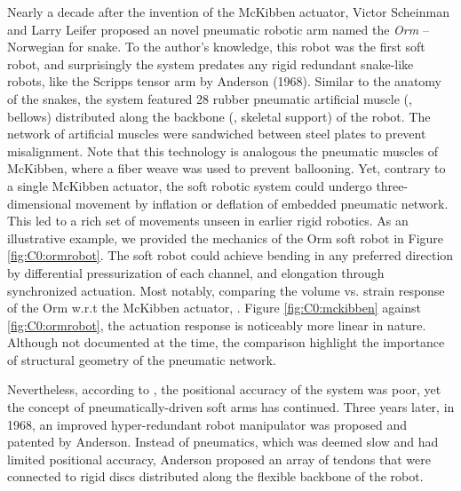 Nearly a decade after the invention of the McKibben actuator, Victor Scheinman and Larry Leifer proposed an {novel} pneumatic robotic arm named the \emph{Orm} -- Norwegian for snake. To the author's knowledge, this robot was the first soft robot, and surprisingly the system predates any rigid redundant snake-like robots, like the Scripps tensor arm by Anderson (1968). Similar to the anatomy of the snakes, the system featured 28 rubber pneumatic artificial muscle (\ie, bellows) distributed along the backbone (\ie, skeletal support) of the robot. The network of artificial muscles were sandwiched between steel plates to prevent misalignment. Note that this technology is analogous the pneumatic muscles of McKibben, where a fiber weave was used to prevent ballooning. Yet, contrary to a single McKibben actuator, the soft robotic system could undergo three-dimensional movement by inflation or deflation of embedded pneumatic network. This led to a rich set of movements unseen in earlier rigid robotics. As an illustrative example, we provided the mechanics of the Orm soft robot in Figure \ref{fig:C0:ormrobot}. The soft robot could achieve bending in any preferred direction by differential pressurization of each channel, and elongation through synchronized actuation. Most notably, comparing the volume vs. strain response of the Orm w.r.t the McKibben actuator, \ie. Figure \ref{fig:C0:mckibben} against \ref{fig:C0:ormrobot}, the actuation response is noticeably more linear in nature. Although not documented at the time, the comparison highlight the importance of structural geometry of the pneumatic network.


Nevertheless, according to \cite{}, the positional accuracy of the system was poor, yet the concept of pneumatically-driven soft arms has continued. Three years later, in 1968, an improved hyper-redundant robot manipulator was proposed and patented by Anderson. Instead of pneumatics, which was deemed slow and had limited positional accuracy, Anderson proposed an array of tendons that were connected to rigid discs distributed along the flexible backbone of the robot. 

